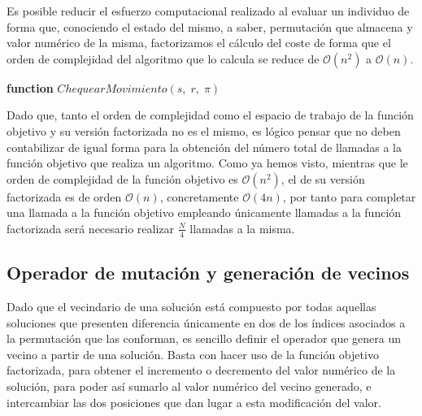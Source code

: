 \documentclass[11pt,a4paper]{article}
\begin{document}
		\noindent Es posible reducir el esfuerzo computacional realizado al evaluar un individuo de forma que, conociendo el estado del mismo, a saber, permutación que almacena y valor numérico de la misma, factorizamos el cálculo del coste de forma que el orden de complejidad del algoritmo que lo calcula se reduce de $\mathcal{O}(n^2)$ a $\mathcal{O}(n)$.			
		
		\begin{algorithm}
			\textbf{function} $ChequearMovimiento(s,\; r,\; \pi)$
			
		\end{algorithm}
		
		\noindent Dado que, tanto el orden de complejidad como el espacio de trabajo de la función objetivo y su versión factorizada no es el mismo, es lógico pensar que no deben contabilizar de igual forma para la obtención del número total de llamadas a la función objetivo que realiza un algoritmo. Como ya hemos visto, mientras que le orden de complejidad de la función objetivo es $\mathcal{O}(n^2)$, el de su versión factorizada es de orden $\mathcal{O}(n)$, concretamente $\mathcal{O}(4n)$, por tanto para completar una llamada a la función objetivo empleando únicamente llamadas a la función factorizada será necesario realizar $\frac{N}{4}$ llamadas a la misma.
		
	\subsection{Operador de mutación y generación de vecinos}
	
		\noindent Dado que el vecindario de una solución está compuesto por todas aquellas soluciones que presenten diferencia únicamente en dos de los índices asociados a la permutación que las conforman, es sencillo definir el operador que genera un vecino a partir de una solución. Basta con hacer uso de la función objetivo factorizada, para obtener el incremento o decremento del valor numérico de la solución, para poder así sumarlo al valor numérico del vecino generado, e intercambiar las dos posiciones que dan lugar a esta modificación del valor.
	
\end{document}
